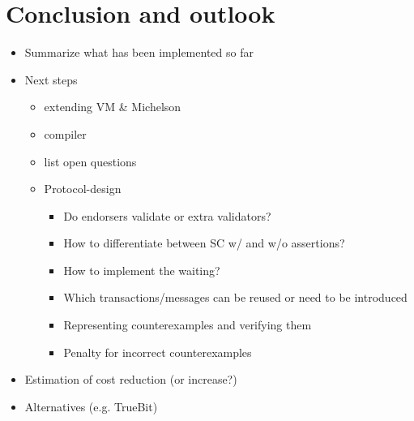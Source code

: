 \chapter{Conclusion and outlook}\label{chap:conclusion}
\draft{}
\begin{itemize}
\item Summarize what has been implemented so far
\item Next steps
	\begin{itemize}
	\item extending VM \& Michelson
	\item compiler
	\item list open questions
	\item Protocol-design
		\begin{itemize}
		\item Do endorsers validate or extra validators?
		\item How to differentiate between SC w/ and w/o assertions?
		\item How to implement the waiting?
		\item Which transactions/messages can be reused or need to be introduced
		\item Representing counterexamples and verifying them
		\item Penalty for incorrect counterexamples
		\end{itemize}
	\end{itemize}
\item Estimation of cost reduction (or increase?)
\item Alternatives (e.g. TrueBit)
\end{itemize}